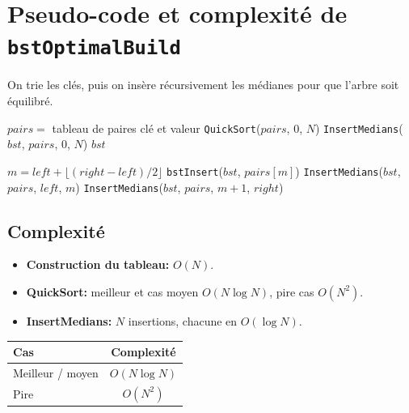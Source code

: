 \section{Pseudo-code et complexité de \texttt{bstOptimalBuild}}

On trie les clés, puis on insère récursivement les médianes
pour que l'arbre soit équilibré.

\begin{algorithm}[H]
\caption{\texttt{bstOptimalBuild}(compfn, lkeys, lvalues)}
\begin{algorithmic}[1]
\State $pairs =$ tableau de paires clé et valeur
\State \texttt{QuickSort}($pairs$, $0$, $N$)
\State \texttt{InsertMedians}($bst$, $pairs$, $0$, $N$)
\State \Return $bst$
\end{algorithmic}
\end{algorithm}

\begin{algorithm}[H]
\caption{\texttt{InsertMedians}($bst$, $pairs$, $left$, $right$)}
\begin{algorithmic}[1]
 \Return \EndIf
\State $m = left + \lfloor(right - left) / 2\rfloor$
\State \texttt{bstInsert}($bst$, $pairs[m]$)
\State \texttt{InsertMedians}($bst$, $pairs$, $left$, $m$)
\State \texttt{InsertMedians}($bst$, $pairs$, $m+1$, $right$)
\end{algorithmic}
\end{algorithm}

\subsection*{Complexité}

\begin{itemize}
    \item \textbf{Construction du tableau:} $O(N)$.
    \item \textbf{QuickSort:} meilleur et cas moyen $O(N \log N)$, pire cas $O(N^2)$.
    \item \textbf{InsertMedians:} $N$ insertions, chacune en $O(\log N)$.
\end{itemize}

\begin{center}
\begin{tabular}{lc}
\toprule
Cas & Complexité \\
\midrule
Meilleur / moyen & $O(N \log N)$ \\
Pire & $O(N^2)$ \\
\bottomrule
\end{tabular}
\end{center}
